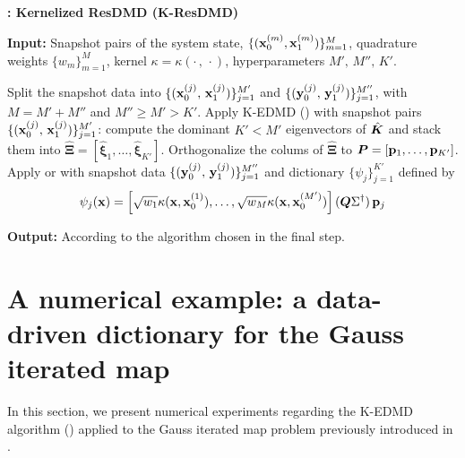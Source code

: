 \begin{algorithm}[h]
\caption{\textbf{: Kernelized ResDMD (K-ResDMD)}}
\label{alg_kresdmd}
\textbf{Input:} Snapshot pairs of the system state, $\{(\vb{x}_0^{(m)}, \vb{x}_1^{(m)})\}_{m = 1}^M$, quadrature weights $\{w_m\}_{m = 1}^M$, kernel $\kappa = \kappa(\cdot\,,\,\cdot)$, hyperparameters $M', \,M'', \,K'$.
\begin{algorithmic}[1]
\State  Split the snapshot data into $\{(\vb{x}_0^{(j)},\,\vb{x}_1^{(j)})\}_{j=1}^{M'}$ and  $\{(\vb{y}_0^{(j)},\,\vb{y}_1^{(j)})\}_{j=1}^{M''}$, with $M = M' + M''$ and $M'' \geq M' > K'$.
\State Apply K-EDMD () with snapshot pairs $\{(\vb{x}_0^{(j)},\,\vb{x}_1^{(j)})\}_{j=1}^{M'}$: compute the dominant $K' < M'$ eigenvectors of $\hat{\vb*{K}}$ and stack them into $\hat{\bm{\Xi}} = \left[\hat{\bm{\xi}}_1, \dots, \hat{\bm{\xi}}_{K'}\right]$. 
\State Orthogonalize the colums of $\hat{\bm{\Xi}}$ to $\vb*{P} = [\vb{p}_1, \dots, \vb{p}_{K'}]$.
\State Apply  or  with snapshot data $\{(\vb{y}_0^{(j)},\,\vb{y}_1^{(j)})\}_{j=1}^{M''}$ and dictionary $\{\psi_j\}_{j = 1}^{K'}$ defined by
\begin{equation*}
    \psi_j(\vb{x}) = \left[\sqrt{w_1} \kappa(\vb{x}, \vb{x}_0^{(1)}), \dots, \sqrt{w_M} \kappa(\vb{x}, \vb{x}_0^{(M')})\right](\vb*{Q}\Sigma^{\dagger})\, \vb{p}_j
\end{equation*}
\end{algorithmic}
\textbf{Output:} According to the algorithm chosen in the final step.
\end{algorithm}

\section{A numerical example: a data-driven dictionary for the Gauss iterated map}
In this section, we present numerical experiments regarding the K-EDMD algorithm () applied to the Gauss iterated map problem previously introduced in . 

